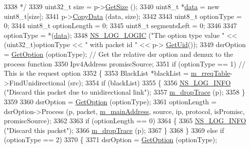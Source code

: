 \begin{DoxyCode}
3338 \textcolor{comment}{   */}
3339   uint32\_t size = p->\hyperlink{classns3_1_1Packet_a462855c9929954d4301a4edfe55f4f1c}{GetSize} ();
3340   uint8\_t *\hyperlink{topology-example-sim_8cc_a26c65296e316af77b787dc77469bb2a4}{data} = \textcolor{keyword}{new} uint8\_t[size];
3341   p->\hyperlink{classns3_1_1Packet_a5a6d304b9e0d90733919ffe224b98f0d}{CopyData} (data, size);
3342 
3343   uint8\_t optionType = 0;
3344   uint8\_t optionLength = 0;
3345   uint8\_t segmentsLeft = 0;
3346 
3347   optionType = *(\hyperlink{topology-example-sim_8cc_a26c65296e316af77b787dc77469bb2a4}{data});
3348   \hyperlink{group__logging_ga88acd260151caf2db9c0fc84997f45ce}{NS\_LOG\_LOGIC} (\textcolor{stringliteral}{"The option type value "} << (uint32\_t)optionType << \textcolor{stringliteral}{" with packet id "} << p->
      \hyperlink{classns3_1_1Packet_a1f212c825b50e54d94f5b9ae99592e6a}{GetUid}());
3349   dsrOption = \hyperlink{classns3_1_1dsr_1_1DsrRouting_a5cdb4c336831a3158c6ba12d226a198e}{GetOption} (optionType);       \textcolor{comment}{// Get the relative dsr option and demux to the
       process function}
3350   Ipv4Address promiscSource;      
3351   \textcolor{keywordflow}{if} (optionType == 1)        \textcolor{comment}{// This is the request option}
3352     \{
3353       BlackList *blackList = \hyperlink{classns3_1_1dsr_1_1DsrRouting_ae9ec27743735fa2d59cc5190961d1942}{m\_rreqTable}->FindUnidirectional (src);
3354       \textcolor{keywordflow}{if} (blackList)
3355         \{
3356           \hyperlink{group__logging_gafbd73ee2cf9f26b319f49086d8e860fb}{NS\_LOG\_INFO} (\textcolor{stringliteral}{"Discard this packet due to unidirectional link"});
3357           \hyperlink{classns3_1_1dsr_1_1DsrRouting_aacee2c8437c0b61579cfa7a420423e03}{m\_dropTrace} (p);
3358         \}
3359 
3360       dsrOption = \hyperlink{classns3_1_1dsr_1_1DsrRouting_a5cdb4c336831a3158c6ba12d226a198e}{GetOption} (optionType);
3361       optionLength = dsrOption->Process (p, packet, \hyperlink{classns3_1_1dsr_1_1DsrRouting_a73182b5edee2d8460f28855e058fc9a0}{m\_mainAddress}, source, ip, protocol, 
      isPromisc, promiscSource);
3362 
3363       \textcolor{keywordflow}{if} (optionLength == 0)
3364         \{
3365           \hyperlink{group__logging_gafbd73ee2cf9f26b319f49086d8e860fb}{NS\_LOG\_INFO} (\textcolor{stringliteral}{"Discard this packet"});
3366           \hyperlink{classns3_1_1dsr_1_1DsrRouting_aacee2c8437c0b61579cfa7a420423e03}{m\_dropTrace} (p);
3367         \}
3368     \}
3369   \textcolor{keywordflow}{else} \textcolor{keywordflow}{if} (optionType == 2)
3370     \{
3371       dsrOption = \hyperlink{classns3_1_1dsr_1_1DsrRouting_a5cdb4c336831a3158c6ba12d226a198e}{GetOption} (optionType);

\end{DoxyCode}
